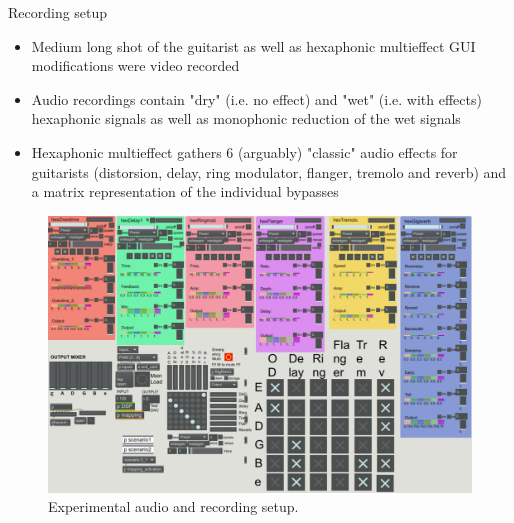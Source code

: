 \documentclass[final]{beamer}
\newlength{\onecolwid}
\newlength{\twocolwid}
\begin{document}
\begin{frame}[t]
\begin{columns}[t]
\begin{column}{\onecolwid}
\begin{block}{Recording setup}
\begin{itemize}
    \item Medium long shot of the guitarist as well as hexaphonic multieffect GUI modifications were video recorded
    \item Audio recordings contain "dry" (i.e. no effect) and "wet" (i.e. with effects) hexaphonic signals as well as monophonic reduction of the wet signals
    \item Hexaphonic multieffect gathers 6 (arguably) "classic" audio effects for guitarists (distorsion, delay, ring modulator, flanger, tremolo and reverb) and a matrix representation of the individual bypasses
\end{itemize}

\begin{figure}[h]
\includegraphics[width = 0.65\onecolwid]{img/191025-Patch-experience.png}
\caption{Experimental audio and recording setup.}
\label{demo}
\end{figure}

\end{block}










\end{column}
\end{columns}
\end{frame}
\end{document}
